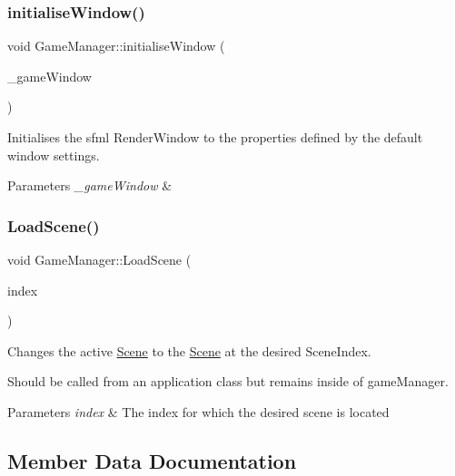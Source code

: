 \subsubsection{\texorpdfstring{initialise\+Window()}{initialiseWindow()}}
{\footnotesize\ttfamily void Game\+Manager\+::initialise\+Window (\begin{DoxyParamCaption}\item[{sf\+::\+Render\+Window \&}]{\+\_\+game\+Window }\end{DoxyParamCaption})\hspace{0.3cm}{\ttfamily [private]}}



Initialises the sfml Render\+Window to the properties defined by the default window settings. 


\begin{DoxyParams}{Parameters}
{\em \+\_\+game\+Window} & \\
\hline
\end{DoxyParams}
\mbox{\label{class_game_manager_a09b8801bcfdd8d5cbc52e27895b84e3b}} 
\subsubsection{\texorpdfstring{Load\+Scene()}{LoadScene()}}
{\footnotesize\ttfamily void Game\+Manager\+::\+Load\+Scene (\begin{DoxyParamCaption}\item[{unsigned int}]{index }\end{DoxyParamCaption})}



Changes the active \hyperlink{class_scene}{Scene} to the \hyperlink{class_scene}{Scene} at the desired Scene\+Index. 

Should be called from an application class but remains inside of game\+Manager.


\begin{DoxyParams}{Parameters}
{\em index} & The index for which the desired scene is located \\
\hline
\end{DoxyParams}


\subsection{Member Data Documentation}
\mbox{\label{class_game_manager_a06843f28cb1609e41da7eee19be9aa87}} 
